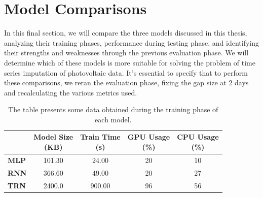 \newpage
\section{Model Comparisons}
In this final section, we will compare the three models discussed in this thesis, analyzing their training phases, performance during testing phase, and identifying their strengths and weaknesses through the previous evaluation phase. We will determine which of these models is more suitable for solving the problem of time series imputation of photovoltaic data. It's essential to specify that to perform these comparisons, we reran the evaluation phase, fixing the gap size at 2 days and recalculating the various metrics used.

%

\begin{table}[H]
	\centering
	\begin{tabular}{l|c|c|c|c}
		             &
		\makecell{\textbf{Model Size}                                   \\\textbf{(KB)}}
		             & \makecell{\textbf{Train Time}                    \\\textbf{(s)}}&
		\makecell{\textbf{GPU Usage}                                    \\\textbf{(\%)}} &
		\makecell{\textbf{CPU Usage}                                    \\\textbf{(\%)}}\\
		\hline
		\textbf{MLP} & 101.30                        & 24.00  & 20 & 10 \\
		\textbf{RNN} & 366.60                        & 49.00  & 20 & 27 \\
		\textbf{TRN} & 2400.0                        & 900.00 & 96 & 56
	\end{tabular}
	\caption{The table presents some data obtained during the training phase of each model.}
	\label{tab:cmptrainphase}
\end{table}

